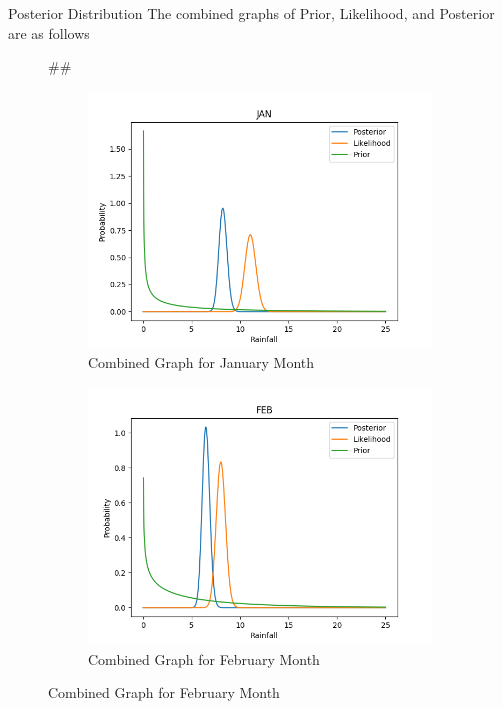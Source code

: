 \documentclass{beamer}
\newenvironment{subcolumns}[1]
 {\valign\bgroup\hsize=#1##\cr}
 {\crcr\egroup}
\newcommand{\nextsubcolumn} {\cr\noalign{\hfill}}
\begin{document}
\begin{frame}{Posterior Distribution}
The combined graphs of Prior, Likelihood, and Posterior are as follows
\begin{figure}[htp]
\centering
\begin{subcolumns}{0.50\columnwidth}
\begin{subfigure}{0.50\columnwidth}
\centering
\includegraphics[width=\textwidth]{Images/JAN.png}
\caption{Combined Graph for January Month}
\end{subfigure}
\nextsubcolumn
\begin{subfigure}{0.5\columnwidth}
\centering
\includegraphics[width=\textwidth]{Images/FEB.png}
\caption{Combined Graph for February Month}
\end{subfigure}
\end{subcolumns}
\end{figure}
\end{frame}
\end{document}
